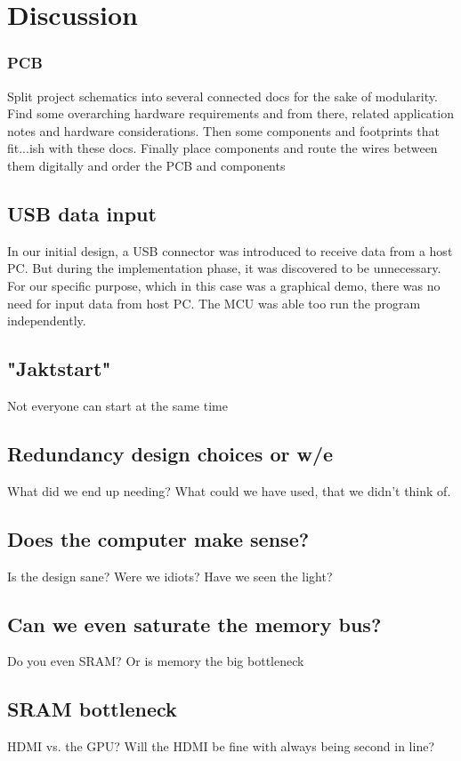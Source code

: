\documentclass[../main/report.tex]{subfiles}
\begin{document}
\chapter{Discussion}



\subsection{PCB}
Split project schematics into several connected docs for the sake of modularity. Find some overarching hardware requirements and from there, related application notes and hardware considerations. Then some components and footprints that fit...ish with these docs.
Finally place components and route the wires between them digitally and order the PCB and components

\section{USB data input}
In our initial design, a USB connector was introduced to receive data from a host PC. 
But during the implementation phase, it was discovered to be unnecessary.
For our specific purpose, which in this case was a graphical demo, there was no need for input data from host PC. 
The MCU was able too run the program independently.

\section{"Jaktstart"}

Not everyone can start at the same time

\section{Redundancy design choices or w/e}
What did we end up needing?
What could we have used, that we didn't think of.

\section{Does the computer make sense?}
Is the design sane?
Were we idiots?
Have we seen the light?

\section{Can we even saturate the memory bus?}
Do you even SRAM?
Or is memory the big bottleneck

\section{SRAM bottleneck}
HDMI vs. the GPU?
Will the HDMI be fine with always being second in line?
\end{document}
